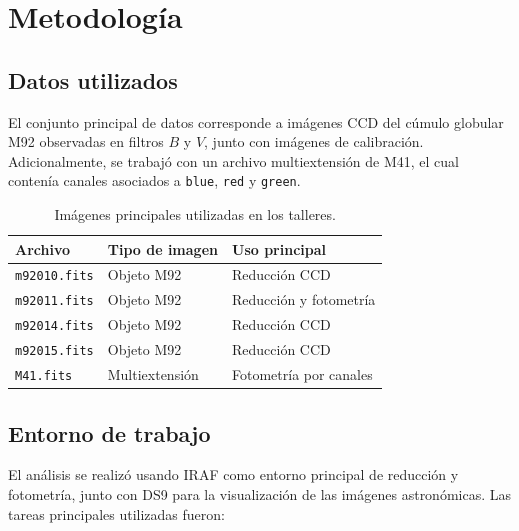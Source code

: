 \documentclass[12pt,letterpaper]{article}
\begin{document}
\section{Metodología}

\subsection{Datos utilizados}

El conjunto principal de datos corresponde a imágenes CCD del cúmulo globular M92 observadas en filtros $B$ y $V$, junto con imágenes de calibración. Adicionalmente, se trabajó con un archivo multiextensión de M41, el cual contenía canales asociados a \texttt{blue}, \texttt{red} y \texttt{green}.

\begin{table}[H]
    \centering
    \begin{tabular}{lll}
        \toprule
        Archivo & Tipo de imagen & Uso principal \\
        \midrule
        \texttt{m92010.fits} & Objeto M92 & Reducción CCD \\
        \texttt{m92011.fits} & Objeto M92 & Reducción y fotometría \\
        \texttt{m92014.fits} & Objeto M92 & Reducción CCD \\
        \texttt{m92015.fits} & Objeto M92 & Reducción CCD \\
        \texttt{M41.fits} & Multiextensión & Fotometría por canales \\
        \bottomrule
    \end{tabular}
    \caption{Imágenes principales utilizadas en los talleres.}
\end{table}

\subsection{Entorno de trabajo}

El análisis se realizó usando IRAF como entorno principal de reducción y fotometría, junto con DS9 para la visualización de las imágenes astronómicas. Las tareas principales utilizadas fueron:
\end{document}

